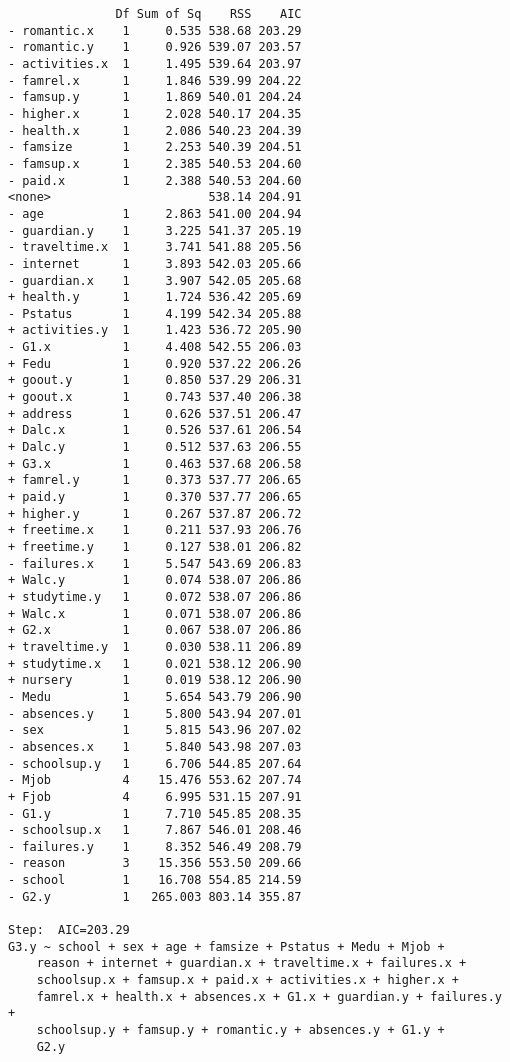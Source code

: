 \documentclass[11pt]{article}
\begin{document}
\begin{enumerate}
\begin{verbatim}
               Df Sum of Sq    RSS    AIC
- romantic.x    1     0.535 538.68 203.29
- romantic.y    1     0.926 539.07 203.57
- activities.x  1     1.495 539.64 203.97
- famrel.x      1     1.846 539.99 204.22
- famsup.y      1     1.869 540.01 204.24
- higher.x      1     2.028 540.17 204.35
- health.x      1     2.086 540.23 204.39
- famsize       1     2.253 540.39 204.51
- famsup.x      1     2.385 540.53 204.60
- paid.x        1     2.388 540.53 204.60
<none>                      538.14 204.91
- age           1     2.863 541.00 204.94
- guardian.y    1     3.225 541.37 205.19
- traveltime.x  1     3.741 541.88 205.56
- internet      1     3.893 542.03 205.66
- guardian.x    1     3.907 542.05 205.68
+ health.y      1     1.724 536.42 205.69
- Pstatus       1     4.199 542.34 205.88
+ activities.y  1     1.423 536.72 205.90
- G1.x          1     4.408 542.55 206.03
+ Fedu          1     0.920 537.22 206.26
+ goout.y       1     0.850 537.29 206.31
+ goout.x       1     0.743 537.40 206.38
+ address       1     0.626 537.51 206.47
+ Dalc.x        1     0.526 537.61 206.54
+ Dalc.y        1     0.512 537.63 206.55
+ G3.x          1     0.463 537.68 206.58
+ famrel.y      1     0.373 537.77 206.65
+ paid.y        1     0.370 537.77 206.65
+ higher.y      1     0.267 537.87 206.72
+ freetime.x    1     0.211 537.93 206.76
+ freetime.y    1     0.127 538.01 206.82
- failures.x    1     5.547 543.69 206.83
+ Walc.y        1     0.074 538.07 206.86
+ studytime.y   1     0.072 538.07 206.86
+ Walc.x        1     0.071 538.07 206.86
+ G2.x          1     0.067 538.07 206.86
+ traveltime.y  1     0.030 538.11 206.89
+ studytime.x   1     0.021 538.12 206.90
+ nursery       1     0.019 538.12 206.90
- Medu          1     5.654 543.79 206.90
- absences.y    1     5.800 543.94 207.01
- sex           1     5.815 543.96 207.02
- absences.x    1     5.840 543.98 207.03
- schoolsup.y   1     6.706 544.85 207.64
- Mjob          4    15.476 553.62 207.74
+ Fjob          4     6.995 531.15 207.91
- G1.y          1     7.710 545.85 208.35
- schoolsup.x   1     7.867 546.01 208.46
- failures.y    1     8.352 546.49 208.79
- reason        3    15.356 553.50 209.66
- school        1    16.708 554.85 214.59
- G2.y          1   265.003 803.14 355.87

Step:  AIC=203.29
G3.y ~ school + sex + age + famsize + Pstatus + Medu + Mjob + 
    reason + internet + guardian.x + traveltime.x + failures.x + 
    schoolsup.x + famsup.x + paid.x + activities.x + higher.x + 
    famrel.x + health.x + absences.x + G1.x + guardian.y + failures.y + 
    schoolsup.y + famsup.y + romantic.y + absences.y + G1.y + 
    G2.y


\end{verbatim}
\end{enumerate}
\end{document}

